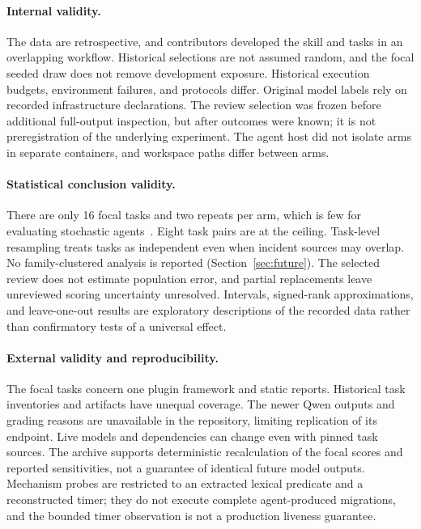 \documentclass[11pt]{article}
\begin{document}
\paragraph{Internal validity.}
The data are retrospective, and contributors developed the skill and tasks in an overlapping workflow. Historical selections are not assumed random, and the focal seeded draw does not remove development exposure. Historical execution budgets, environment failures, and protocols differ. Original model labels rely on recorded infrastructure declarations. The review selection was frozen before additional full-output inspection, but after outcomes were known; it is not preregistration of the underlying experiment. The agent host did not isolate arms in separate containers, and workspace paths differ between arms.

\paragraph{Statistical conclusion validity.}
There are only 16 focal tasks and two repeats per arm, which is few for evaluating stochastic agents~\citep{arcuri2011practical}. Eight task pairs are at the ceiling. Task-level resampling treats tasks as independent even when incident sources may overlap. No family-clustered analysis is reported (Section~\ref{sec:future}). The selected review does not estimate population error, and partial replacements leave unreviewed scoring uncertainty unresolved. Intervals, signed-rank approximations, and leave-one-out results are exploratory descriptions of the recorded data rather than confirmatory tests of a universal effect.

\paragraph{External validity and reproducibility.}
The focal tasks concern one plugin framework and static reports. Historical task inventories and artifacts have unequal coverage. The newer Qwen outputs and grading reasons are unavailable in the repository, limiting replication of its endpoint. Live models and dependencies can change even with pinned task sources. The archive supports deterministic recalculation of the focal scores and reported sensitivities, not a guarantee of identical future model outputs. Mechanism probes are restricted to an extracted lexical predicate and a reconstructed timer; they do not execute complete agent-produced migrations, and the bounded timer observation is not a production liveness guarantee.
\end{document}
